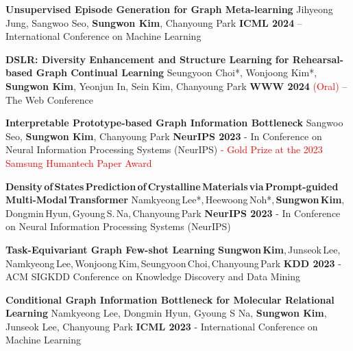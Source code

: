 \documentclass[letterpaper,MMMyyyy,nonstopmode]{simpleresumecv}
\begin{document}
\begin{Body}
\Gap
\NumberedItem{[C6]}
\textbf{Unsupervised Episode Generation for Graph Meta-learning}
\newline
Jihyeong Jung, Sangwoo Seo, \textbf{Sungwon Kim}, Chanyoung Park
\newline
\textbf{ICML 2024} – International Conference on Machine Learning

\Gap
\NumberedItem{[C5]}
\textbf{DSLR: Diversity Enhancement and Structure Learning for Rehearsal-based Graph Continual Learning}
\newline
Seungyoon Choi*, Wonjoong Kim*, \textbf{Sungwon Kim}, Yeonjun In, Sein Kim, Chanyoung Park
\newline
\textbf{WWW 2024} \textcolor{red}{(Oral)} – The Web Conference

\Gap
\NumberedItem{[C4]}
\textbf{Interpretable Prototype-based Graph Information Bottleneck}
\newline
Sangwoo Seo, \textbf{Sungwon Kim}, Chanyoung Park
\newline
\textbf{NeurIPS 2023} - In Conference on Neural Information Processing Systems (NeurIPS)
\newline
\textcolor{red}{- Gold Prize at the 2023 Samsung Humantech Paper Award}

\Gap
\NumberedItem{[C3]}
\textbf{Density\,of\,States\,Prediction\,of\,Crystalline\,Materials\,via\,Prompt-guided\,Multi-Modal\,Transformer}
\newline
Namkyeong\,Lee*,\,Heewoong\,Noh*,\,\textbf{Sungwon\,Kim},\,Dongmin\,Hyun,\,Gyoung\,S.\,Na,\,Chanyoung\,Park
\newline
\textbf{NeurIPS 2023} - In Conference on Neural Information Processing Systems (NeurIPS)

\Gap
\NumberedItem{[C2]}
\textbf{Task-Equivariant Graph Few-shot Learning}
\newline
\textbf{Sungwon\,Kim},\,Junseok\,Lee,\,Namkyeong\,Lee,\,Wonjoong\,Kim,\,Seungyoon\,Choi,\,Chanyoung\,Park
\newline
\textbf{KDD 2023} - ACM SIGKDD Conference on Knowledge Discovery and Data Mining

\Gap
\NumberedItem{[C1]}
\textbf{Conditional Graph Information Bottleneck for Molecular Relational Learning}
\newline
Namkyeong Lee, Dongmin Hyun, Gyoung S Na, \textbf{Sungwon Kim}, Junseok Lee, Chanyoung Park
\newline
\textbf{ICML 2023} - International Conference on Machine Learning

\endgroup
\Gap


\end{Body}
\end{document}

